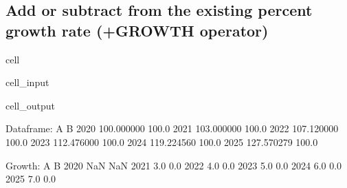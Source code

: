 \documentclass[letterpaper,10pt,english]{jupyterBook}
\begin{document}
\subsection{Add or subtract from the existing percent growth rate (+GROWTH operator)}
\label{\detokenize{content/howto/update/model update:add-or-subtract-from-the-existing-percent-growth-rate-growth-operator}}
\begin{sphinxuseclass}{cell}\begin{sphinxVerbatimInput}

\begin{sphinxuseclass}{cell_input}
\begin{sphinxVerbatim}[commandchars=\\\{\}]
 
\end{sphinxVerbatim}

\end{sphinxuseclass}\end{sphinxVerbatimInput}
\begin{sphinxVerbatimOutput}

\begin{sphinxuseclass}{cell_output}
\begin{sphinxVerbatim}[commandchars=\\\{\}]
Dataframe:
               A      B
2020  100.000000  100.0
2021  103.000000  100.0
2022  107.120000  100.0
2023  112.476000  100.0
2024  119.224560  100.0
2025  127.570279  100.0

Growth:
        A    B
2020  NaN  NaN
2021  3.0  0.0
2022  4.0  0.0
2023  5.0  0.0
2024  6.0  0.0
2025  7.0  0.0
\end{sphinxVerbatim}

\end{sphinxuseclass}\end{sphinxVerbatimOutput}

\end{sphinxuseclass}
\end{document}
